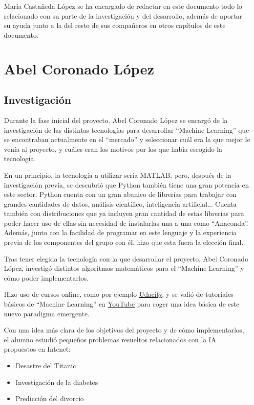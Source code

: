 María Castañeda López se ha encargado de redactar en este documento todo lo relacionado con su parte de la investigación y del desarrollo, además de aportar su ayuda junto a la del resto de sus compañeros en otros capítulos de este documento.

\section{Abel Coronado López}
\subsection{Investigación}

Durante la fase inicial del proyecto, Abel Coronado López se encargó de la investigación de las distintas tecnologías para desarrollar ``Machine Learning'' que se encontraban actualmente en el ``mercado'' y seleccionar cuál era la que mejor le venía al proyecto, y cuáles eran los motivos por los que había escogido la tecnología.

En un principio, la tecnología a utilizar sería MATLAB, pero, después de la investigación previa, se descubrió que Python también tiene una gran potencia en este sector. Python cuenta con un gran abanico de librerías para trabajar con grandes cantidades de datos, análisis científico, inteligencia artificial... Cuenta también con distribuciones que ya incluyen gran cantidad de estas librerías para poder hacer uso de ellas sin necesidad de instalarlas una a una como ``Anaconda''. Además, junto con la facilidad de programar en este lenguaje y la experiencia previa de los componentes del grupo con él, hizo que esta fuera la elección final.

Tras tener elegida la tecnología con la que desarrollar el proyecto, Abel Coronado López, investigó distintos algoritmos matemáticos para el ``Machine Learning'' y cómo poder implementarlos.

Hizo uso de cursos online, como por ejemplo \href{https://www.udacity.com}{Udacity}, y se valió de tutoriales básicos de ``Machine Learning'' en \href{https://www.youtube.com}{YouTube} para coger una idea básica de este nuevo paradigma emergente.

Con una idea más clara de los objetivos del proyecto y de cómo implementarlos, el alumno estudió pequeños problemas resueltos relacionados con la IA propuestos en Intenet:

\begin{itemize}
\item Desastre del Titanic
\item Investigación de la diabetes
\item Predicción del divorcio
\end{itemize}

